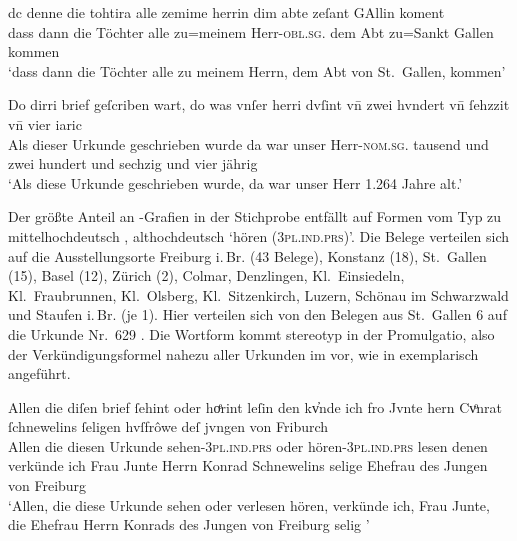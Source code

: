 \begin{exe}
\ex \label{ex:herrin}
	\begin{xlist}
	\ex\label{ex:stg_herrin}
		\setlength{\glossglue}{5pt plus 2pt minus 1pt}
		\gll dc denne die tohtira alle zemime herrin dim abte zeſant GAllin
				koment\\
			dass dann die Töchter alle zu=meinem Herr-\textsc{obl.sg.\MascM}
				dem Abt zu=Sankt Gallen kommen \\
		\trans `dass dann die Töchter alle zu meinem Herrn, dem Abt von
			St.~Gallen, kommen'
			\parencites(Nr.~628, St.~Gallen, 1284)[56,34]{cao2}

	\ex\label{ex:col_herri}
		\gll Do dirri brief geſcriben wart, do was vnſer herri dvſint vn̄ zwei
				hvndert vn̄ ſehzzit vn̄ vier iaric \\
			Als dieser Urkunde geschrieben wurde da war unser
				Herr-\textsc{nom.sg.\MascM} tausend und zwei hundert und
				sechzig und vier jährig \\
		\trans `Als diese Urkunde geschrieben wurde, da war unser Herr
			1.264 Jahre alt.'
			\parencites(Nr.~N~53, Colmar, 1264)[37,15]{cao5}
\end{xlist}
\end{exe}

Der größte Anteil an -Grafien in der Stichprobe entfällt auf Formen vom
Typ  zu mittelhochdeutsch , althochdeutsch
 `hören (\textsc{3pl.ind.prs})'. Die Belege verteilen sich auf die
Ausstellungsorte Freiburg i.\,Br. (43 Belege), Konstanz (18), St.~Gallen (15),
Basel (12), Zürich (2), Colmar, Denzlingen, Kl.~Einsiedeln, Kl.~Fraubrunnen,
Kl.~Olsberg, Kl.~Sitzenkirch, Luzern, Schönau im Schwarzwald und Staufen
i.\,Br. (je 1). Hier verteilen sich von den Belegen aus St.~Gallen 6 auf die
Urkunde Nr.~629 \autocites(St.~Gallen, 1284)[57,9--57,35]{cao2}. Die Wortform
 kommt stereotyp in der Promulgatio, also der Verkündigungsformel
nahezu aller Urkunden im \CAO{} vor, wie in  exemplarisch
angeführt.

\begin{exe}
\ex\label{ex:fribr_hoerint}
	\gll Allen die diſen brief ſehint oder hoͤrint leſin den kv̓nde ich fro
			Jvnte hern Cvͦnrat ſchnewelins ſeligen hvſfrôwe deſ jvngen von
			Friburch \\
		Allen die diesen Urkunde sehen-\textsc{3pl.ind.prs} oder
			hören-\textsc{3pl.ind.prs} lesen denen verkünde ich Frau Junte Herrn
			Konrad Schnewelins selige Ehefrau des Jungen von Freiburg \\
	\trans `Allen, die diese Urkunde sehen oder verlesen hören, verkünde
		ich, Frau Junte, die Ehefrau Herrn Konrads des Jungen von Freiburg
		selig \textelp{}'
		\parencites(Nr.~328, Freiburg i.\,Br., 1277)[314,33--34]{cao1}
\end{exe}

